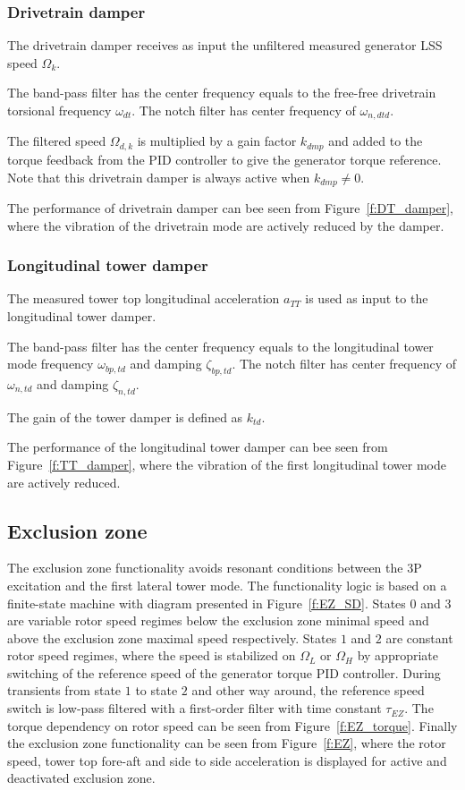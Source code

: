 \subsubsection{Drivetrain damper}
\label{s:dmp}

The drivetrain damper receives as input the unfiltered measured generator LSS speed $\Omega_k$.

The band-pass filter has the center frequency equals to the free-free drivetrain torsional frequency $\omega_{dt}$.
The notch filter has center frequency of $\omega_{n,dtd}$. 

The filtered speed $\Omega_{d,k}$ is multiplied by a gain factor $k_{dmp}$ and added to the torque feedback from the PID controller to give the generator torque reference. Note that this drivetrain damper is always active when $k_{dmp}\ne0$. 


The performance of drivetrain damper can bee seen from Figure~\ref{f:DT_damper}, where the vibration of the drivetrain mode are actively reduced by the damper.

\subsubsection{Longitudinal tower damper}
\label{s:TTdmp}


The measured tower top longitudinal acceleration $a_{TT}$ is used as input to the longitudinal tower damper.

The band-pass filter has the center frequency equals to the longitudinal tower mode frequency $\omega_{bp,td}$ and damping $\zeta_{bp,td}$.
The notch filter has center frequency of  $\omega_{n,td}$ and damping $\zeta_{n,td}$. 

The gain of the tower damper is defined as $k_{td}$.

The performance of the longitudinal tower damper can bee seen from Figure~\ref{f:TT_damper}, where the vibration of the first longitudinal tower mode are actively reduced.

\subsection{Exclusion zone}
\label{s:EZ}

The exclusion zone functionality avoids resonant conditions between the 3P excitation and the first lateral tower mode. The functionality logic is based on a finite-state machine with diagram presented in Figure~\ref{f:EZ_SD}. States $0$ and $3$ are variable rotor speed regimes below the exclusion zone minimal speed and above the exclusion zone maximal speed respectively. States $1$ and $2$ are constant rotor speed regimes, where the speed is stabilized on $\Omega_L$ or $\Omega_H$ by appropriate switching of the reference speed of the generator torque PID controller. During transients from state $1$ to state $2$ and other way around, the reference speed switch is low-pass filtered with a first-order filter with time constant $\tau_{EZ}$. The torque dependency on rotor speed can be seen from Figure~\ref{f:EZ_torque}. Finally the exclusion zone functionality can be seen from Figure~\ref{f:EZ}, where the rotor speed, tower top fore-aft and side to side acceleration is displayed for active and deactivated exclusion zone.

